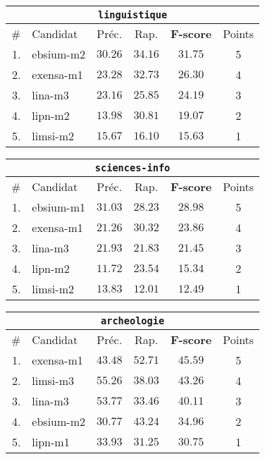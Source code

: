 \documentclass[10pt,twoside]{article}
\begin{document}
\begin{center}

\begin{tabular}{| r l | c c c c |}
\hline
\multicolumn{6}{|c|}{\texttt{linguistique}} \\
\hline
\# & Candidat & Préc. & Rap. & \textbf{F-score} & Points \\
\hline
1. & ebsium-m2 & $30.26$ & $34.16$ & $\mathbf{31.75}$ & 5  \\
2. & exensa-m1 & $23.28$ & $32.73$ & $\mathbf{26.30}$ & 4  \\
3. & lina-m3 & $23.16$ & $25.85$ & $\mathbf{24.19}$ & 3  \\
4. & lipn-m2 & $13.98$ & $30.81$ & $\mathbf{19.07}$ & 2  \\
5. & limsi-m2 & $15.67$ & $16.10$ & $\mathbf{15.63}$ & 1  \\
\hline
\end{tabular}

    
    
\begin{tabular}{| r l | c c c c |}
\hline
\multicolumn{6}{|c|}{\texttt{sciences-info}} \\
\hline
\# & Candidat & Préc. & Rap. & \textbf{F-score} & Points \\
\hline
1. & ebsium-m1 & $31.03$ & $28.23$ & $\mathbf{28.98}$ & 5  \\
2. & exensa-m1 & $21.26$ & $30.32$ & $\mathbf{23.86}$ & 4  \\
3. & lina-m3 & $21.93$ & $21.83$ & $\mathbf{21.45}$ & 3  \\
4. & lipn-m2 & $11.72$ & $23.54$ & $\mathbf{15.34}$ & 2  \\
5. & limsi-m2 & $13.83$ & $12.01$ & $\mathbf{12.49}$ & 1  \\
\hline
\end{tabular}


\begin{tabular}{| r l | c c c c |}
\hline
\multicolumn{6}{|c|}{\texttt{archeologie}} \\
\hline
\# & Candidat & Préc. & Rap. & \textbf{F-score} & Points \\
\hline
1. & exensa-m1 & $43.48$ & $52.71$ & $\mathbf{45.59}$ & 5  \\
2. & limsi-m3 & $55.26$ & $38.03$ & $\mathbf{43.26}$ & 4  \\
3. & lina-m3 & $53.77$ & $33.46$ & $\mathbf{40.11}$ & 3  \\
4. & ebsium-m2 & $30.77$ & $43.24$ & $\mathbf{34.96}$ & 2  \\
5. & lipn-m1 & $33.93$ & $31.25$ & $\mathbf{30.75}$ & 1  \\
\hline
\end{tabular}



\end{center}
\end{document}
